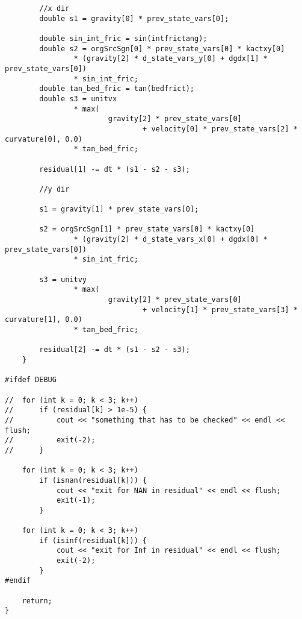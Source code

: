 \documentclass[a4paper,10pt]{article}
\begin{document}
\begin{lstlisting}
		//x dir
		double s1 = gravity[0] * prev_state_vars[0];

		double sin_int_fric = sin(intfrictang);
		double s2 = orgSrcSgn[0] * prev_state_vars[0] * kactxy[0]
				* (gravity[2] * d_state_vars_y[0] + dgdx[1] * prev_state_vars[0])
				* sin_int_fric;
		double tan_bed_fric = tan(bedfrict);
		double s3 = unitvx
				* max(
						gravity[2] * prev_state_vars[0]
								+ velocity[0] * prev_state_vars[2] * curvature[0], 0.0)
				* tan_bed_fric;

		residual[1] -= dt * (s1 - s2 - s3);

		//y dir

		s1 = gravity[1] * prev_state_vars[0];

		s2 = orgSrcSgn[1] * prev_state_vars[0] * kactxy[0]
				* (gravity[2] * d_state_vars_x[0] + dgdx[0] * prev_state_vars[0])
				* sin_int_fric;

		s3 = unitvy
				* max(
						gravity[2] * prev_state_vars[0]
								+ velocity[1] * prev_state_vars[3] * curvature[1], 0.0)
				* tan_bed_fric;

		residual[2] -= dt * (s1 - s2 - s3);
	}

#ifdef DEBUG

//	for (int k = 0; k < 3; k++)
//		if (residual[k] > 1e-5) {
//			cout << "something that has to be checked" << endl << flush;
//			exit(-2);
//		}

	for (int k = 0; k < 3; k++)
		if (isnan(residual[k])) {
			cout << "exit for NAN in residual" << endl << flush;
			exit(-1);
		}

	for (int k = 0; k < 3; k++)
		if (isinf(residual[k])) {
			cout << "exit for Inf in residual" << endl << flush;
			exit(-2);
		}
#endif

	return;
}

\end{lstlisting}
\end{document}
